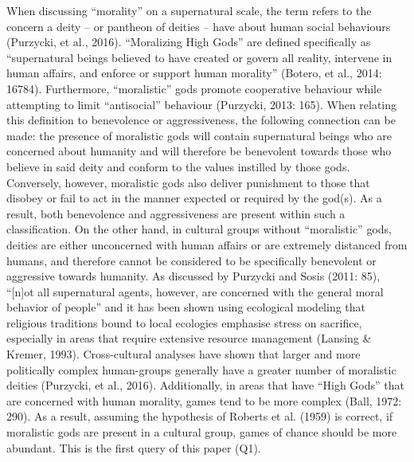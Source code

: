 \documentclass[%
	]{ijsra}
\begin{document}
When discussing “morality” on a supernatural scale, the term refers to the concern a deity – or pantheon of deities – have about human social behaviours (Purzycki, et al., 2016). “Moralizing High Gods” are defined specifically as “supernatural beings believed to have created or govern all reality, intervene in human affairs, and enforce or support human morality” (Botero, et al., 2014: 16784). Furthermore, “moralistic” gods promote cooperative behaviour while attempting to limit “antisocial” behaviour (Purzycki, 2013: 165). When relating this definition to benevolence or aggressiveness, the following connection can be made: the presence of moralistic gods will contain supernatural beings who are concerned about humanity and will therefore be benevolent towards those who believe in said deity and conform to the values instilled by those gods. Conversely, however, moralistic gods also deliver punishment to those that disobey or fail to act in the manner expected or required by the god(s). As a result, both benevolence and aggressiveness are present within such a classification. On the other hand, in cultural groups without “moralistic” gods, deities are either unconcerned with human affairs or are extremely distanced from humans, and therefore cannot be considered to be specifically benevolent or aggressive towards humanity. As discussed by Purzycki and Sosis (2011: 85), “[n]ot all supernatural agents, however, are concerned with the general moral behavior of people” and it has been shown using ecological modeling that religious traditions bound to local ecologies emphasise stress on sacrifice, especially in areas that require extensive resource management (Lansing & Kremer, 1993). Cross-cultural analyses have shown that larger and more politically complex human-groups generally have a greater number of moralistic deities (Purzycki, et al., 2016). Additionally, in areas that have “High Gods” that are concerned with human morality, games tend to be more complex (Ball, 1972: 290). As a result, assuming the hypothesis of Roberts et al. (1959) is correct, if moralistic gods are present in a cultural group, games of chance should be more abundant. This is the first query of this paper (Q1).
\end{document}
